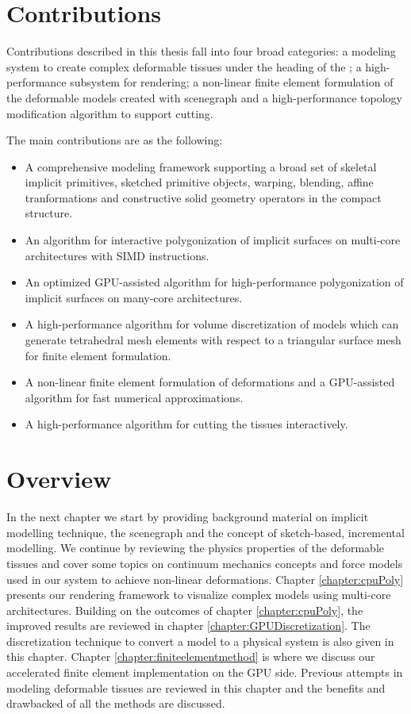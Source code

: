 \section{Contributions}
Contributions described in this thesis fall into four broad categories: a modeling system to create complex deformable tissues under the heading of the 
\blob; a high-performance subsystem for rendering; a non-linear finite element formulation of the deformable models created with \blob scenegraph and
a high-performance topology modification algorithm to support cutting. 

The main contributions are as the following:

\begin{itemize}
 \item A comprehensive modeling framework supporting a broad set of skeletal implicit primitives, sketched primitive objects, warping, blending, 
 affine tranformations and constructive solid geometry operators in the compact \blob structure.
 \item An algorithm for interactive polygonization of implicit surfaces on multi-core architectures with SIMD instructions.
 \item An optimized GPU-assisted algorithm for high-performance polygonization of implicit surfaces on many-core architectures.
 \item A high-performance algorithm for volume discretization of \blob models which can generate tetrahedral mesh elements with respect to a triangular 
 surface mesh for finite element formulation.
 \item A non-linear finite element formulation of deformations and a GPU-assisted algorithm for fast numerical approximations.
 \item A high-performance algorithm for cutting the tissues interactively. 
\end{itemize}


\section{Overview}
In the next chapter we start by providing background material on implicit modelling technique, the \blob scenegraph and the concept of sketch-based, incremental modelling.
We continue by reviewing the physics properties of the deformable tissues and cover some topics on continuum mechanics concepts and force models used in
our system to achieve non-linear deformations. Chapter \ref{chapter:cpuPoly} presents our rendering framework to visualize complex \blob models using multi-core 
architectures. Building on the outcomes of chapter \ref{chapter:cpuPoly}, the improved results are reviewed in chapter \ref{chapter:GPUDiscretization}. 
The discretization technique to convert a \blob model to a physical system is also given in this chapter. Chapter \ref{chapter:finiteelementmethod} is 
where we discuss our accelerated finite element implementation on the GPU side. Previous attempts in modeling deformable tissues are reviewed in this chapter and
the benefits and drawbacked of all the methods are discussed. 

